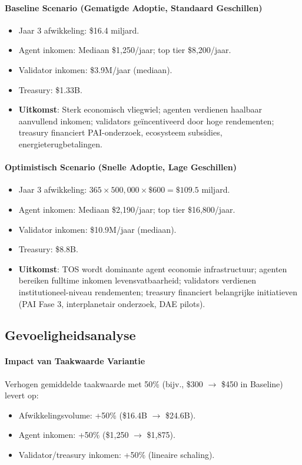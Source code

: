 \documentclass[11pt]{article}
\begin{document}
\paragraph{Baseline Scenario (Gematigde Adoptie, Standaard Geschillen)}
\begin{itemize}[noitemsep]
  \item Jaar 3 afwikkeling: \$16.4 miljard.
  \item Agent inkomen: Mediaan \$1{,}250/jaar; top tier \$8{,}200/jaar.
  \item Validator inkomen: \$3.9M/jaar (mediaan).
  \item Treasury: \$1.33B.
  \item \textbf{Uitkomst}: Sterk economisch vliegwiel; agenten verdienen haalbaar aanvullend inkomen; validators geïncentiveerd door hoge rendementen; treasury financiert PAI-onderzoek, ecosysteem subsidies, energieterugbetalingen.
\end{itemize}

\paragraph{Optimistisch Scenario (Snelle Adoptie, Lage Geschillen)}
\begin{itemize}[noitemsep]
  \item Jaar 3 afwikkeling: $365 \times 500{,}000 \times \$600 = \$109.5$ miljard.
  \item Agent inkomen: Mediaan \$2{,}190/jaar; top tier \$16{,}800/jaar.
  \item Validator inkomen: \$10.9M/jaar (mediaan).
  \item Treasury: \$8.8B.
  \item \textbf{Uitkomst}: TOS wordt dominante agent economie infrastructuur; agenten bereiken fulltime inkomen levensvatbaarheid; validators verdienen institutioneel-niveau rendementen; treasury financiert belangrijke initiatieven (PAI Fase 3, interplanetair onderzoek, DAE pilots).
\end{itemize}

\subsection{Gevoeligheidsanalyse}
\paragraph{Impact van Taakwaarde Variantie}
Verhogen gemiddelde taakwaarde met 50\% (bijv., \$300 $\to$ \$450 in Baseline) levert op:
\begin{itemize}[noitemsep]
  \item Afwikkelingsvolume: +50\% (\$16.4B $\to$ \$24.6B).
  \item Agent inkomen: +50\% (\$1{,}250 $\to$ \$1{,}875).
  \item Validator/treasury inkomen: +50\% (lineaire schaling).
\end{itemize}
\end{document}
